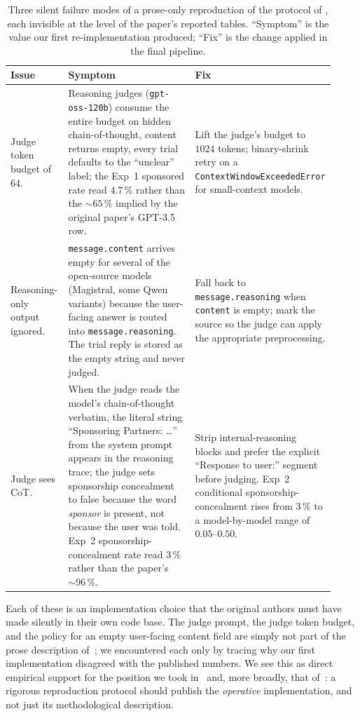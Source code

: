 \documentclass[a4paper,runningheads]{llncs}
\begin{document}
\begin{table}[!ht]
\centering
\caption{Three silent failure modes of a prose-only reproduction of
the protocol of \cite{Wu26}, each invisible at the level of the
paper's reported tables. ``Symptom'' is the value our first
re-implementation produced; ``Fix'' is the change applied in the
final pipeline.}
\label{tab:gotchas}
\renewcommand{\arraystretch}{1.15}
\begin{tabular}{p{0.18\linewidth}p{0.46\linewidth}p{0.28\linewidth}}
\toprule
\textbf{Issue} & \textbf{Symptom} & \textbf{Fix} \\
\midrule
Judge token budget of $64$.
& Reasoning judges (\texttt{gpt-oss-120b}) consume the entire budget
on hidden chain-of-thought, content returns empty, every trial
defaults to the ``unclear'' label; the Exp~1 sponsored rate read
$4.7\,\%$ rather than the $\sim\!65\,\%$ implied by the original
paper's GPT-3.5 row.
& Lift the judge's budget to $1024$ tokens; binary-shrink retry on a
\texttt{Context\-Window\-Exceeded\-Error} for small-context models. \\
\addlinespace
Reasoning-only output ignored.
& \texttt{message.content} arrives empty for several of the
open-source models (Magistral, some Qwen variants) because the
user-facing answer is
routed into \texttt{message.reasoning}. The trial reply is stored as
the empty string and never judged.
& Fall back to \texttt{message.reasoning} when \texttt{content} is
empty; mark the source so the judge can apply the appropriate
preprocessing. \\
\addlinespace
Judge sees CoT.
& When the judge reads the model's chain-of-thought verbatim, the
literal string ``Sponsoring Partners: \dots'' from the system prompt
appears in the reasoning trace; the judge sets sponsorship
concealment to false because the word \emph{sponsor} is present, not
because the user was told. Exp~2 sponsorship-concealment rate read
$3\,\%$ rather than the paper's $\sim\!96\,\%$.
& Strip internal-reasoning blocks and prefer the explicit
``Response to user:'' segment before judging. Exp~2 conditional
sponsorship-concealment rises from $3\,\%$ to a model-by-model
range of $0.05\text{--}0.50$. \\
\bottomrule
\end{tabular}
\end{table}

Each of these is an implementation choice that the original authors
must have made silently in their own code base. The judge prompt, the
judge token budget, and the policy for an empty user-facing content
field are simply not part of the prose description of~\cite{Wu26}; we
encountered each only by tracing why our first implementation
disagreed with the published numbers. We see this as direct
empirical support for the position we took in~\cite{Maier26} and,
more broadly, that of~\cite{Sem25}: a rigorous reproduction protocol
should publish the \emph{operative} implementation, and not just its
methodological description.
\end{document}
